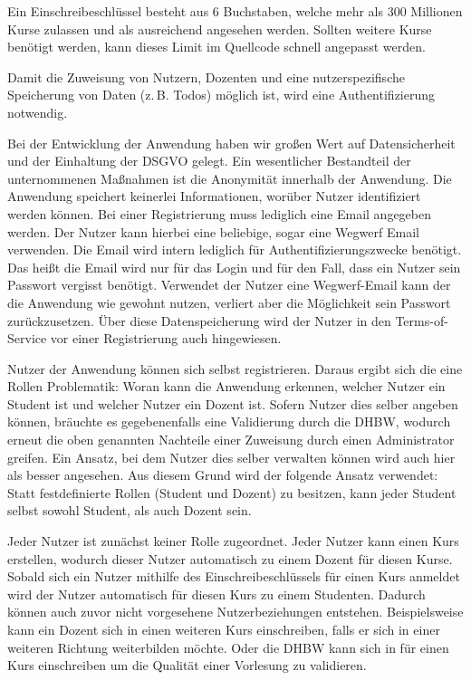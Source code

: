 Ein Einschreibeschlüssel besteht aus 6 Buchstaben, welche mehr als 300 Millionen Kurse zulassen und als ausreichend angesehen werden.
Sollten weitere Kurse benötigt werden, kann dieses Limit im Quellcode schnell angepasst werden.





Damit die Zuweisung von Nutzern, Dozenten und eine nutzerspezifische Speicherung von Daten (z.\,B. Todos) möglich ist, wird eine Authentifizierung notwendig.



Bei der Entwicklung der Anwendung haben wir großen Wert auf Datensicherheit und der Einhaltung der DSGVO gelegt.
Ein wesentlicher Bestandteil der unternommenen Maßnahmen ist die Anonymität innerhalb der Anwendung.
Die Anwendung speichert keinerlei Informationen, worüber Nutzer identifiziert werden können.
Bei einer Registrierung muss lediglich eine Email angegeben werden.
Der Nutzer kann hierbei eine beliebige, sogar eine Wegwerf Email verwenden.
Die Email wird intern lediglich für Authentifizierungszwecke benötigt.
Das heißt die Email wird nur für das Login und für den Fall, dass ein Nutzer sein Passwort vergisst benötigt.
Verwendet der Nutzer eine Wegwerf-Email kann der die Anwendung wie gewohnt nutzen, verliert aber die Möglichkeit sein Passwort zurückzusetzen. 
Über diese Datenspeicherung wird der Nutzer in den Terms-of-Service vor einer Registrierung auch hingewiesen. %


Nutzer der Anwendung können sich selbst registrieren.
Daraus ergibt sich die eine Rollen Problematik: Woran kann die Anwendung erkennen, welcher Nutzer ein Student ist und welcher Nutzer ein Dozent ist.
Sofern Nutzer dies selber angeben können, bräuchte es gegebenenfalls eine Validierung durch die DHBW, wodurch erneut die oben genannten Nachteile einer Zuweisung durch einen Administrator greifen.
Ein Ansatz, bei dem Nutzer dies selber verwalten können wird auch hier als besser angesehen.
Aus diesem Grund wird der folgende Ansatz verwendet:
Statt festdefinierte Rollen (Student und Dozent) zu besitzen, kann jeder Student selbst sowohl Student, als auch Dozent sein.

Jeder Nutzer ist zunächst keiner Rolle zugeordnet.
Jeder Nutzer kann einen Kurs erstellen, wodurch dieser Nutzer automatisch zu einem Dozent für diesen Kurse.
Sobald sich ein Nutzer mithilfe des Einschreibeschlüssels für einen Kurs anmeldet wird der Nutzer automatisch für diesen Kurs zu einem Studenten.
Dadurch können auch zuvor nicht vorgesehene Nutzerbeziehungen entstehen.
Beispielsweise kann ein Dozent sich in einen weiteren Kurs einschreiben, falls er sich in einer weiteren Richtung weiterbilden möchte.
Oder die DHBW kann sich in für einen Kurs einschreiben um die Qualität einer Vorlesung zu validieren.


